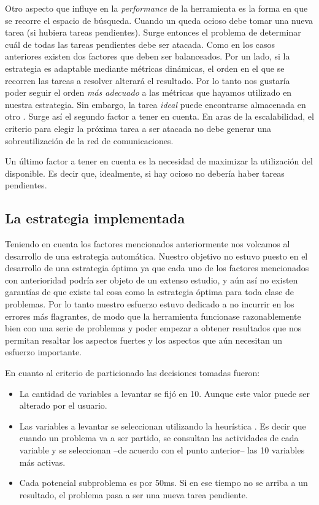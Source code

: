 Otro aspecto que influye en la \emph{performance} de la herramienta es la
forma en que se recorre el espacio de búsqueda. Cuando un \w queda ocioso debe
tomar una nueva tarea (si hubiera tareas pendientes). Surge entonces el
problema de determinar cuál de todas las tareas pendientes debe ser atacada.
Como en los casos anteriores existen dos factores que deben ser balanceados.
Por un lado, si la estrategia es adaptable mediante métricas dinámicas, el
orden en el que se recorren las tareas a resolver alterará el resultado.
 Por lo tanto nos gustaría poder
seguir el orden \emph{más adecuado} a las métricas que hayamos utilizado en
nuestra estrategia. Sin embargo, la tarea \emph{ideal} puede encontrarse
almacenada en otro \w. Surge así el segundo factor a tener en cuenta. En aras
de la escalabilidad, el criterio para elegir la próxima tarea a ser atacada no
debe generar una sobreutilización de la red de comunicaciones.

Un último factor a tener en cuenta es la necesidad de maximizar la utilización
del \hard disponible. Es decir que, idealmente, si hay \hard ocioso no debería
haber tareas pendientes.

\subsection{La estrategia implementada}

Teniendo en cuenta los factores mencionados anteriormente nos volcamos al
desarrollo de una estrategia automática. Nuestro objetivo no estuvo puesto en
el desarrollo de una estrategia óptima ya que cada uno de los factores
mencionados con anterioridad podría ser objeto de un extenso estudio, y aún
así no existen garantías de que existe tal cosa como la estrategia óptima para
toda clase de problemas. Por lo tanto nuestro esfuerzo estuvo dedicado a no
incurrir en los errores más flagrantes, de modo que la herramienta funcionase
razonablemente bien con una serie de problemas y poder empezar a obtener
resultados que nos permitan resaltar los aspectos fuertes y los aspectos que
aún necesitan un esfuerzo importante.

En cuanto al criterio de particionado las decisiones tomadas fueron:

\begin{itemize}
	\item La cantidad de variables a levantar se fijó en 10. Aunque este valor puede ser alterado por el usuario.
	\item Las variables a levantar se seleccionan utilizando la heurística \vsids. Es decir que cuando un problema va a ser partido, se consultan las actividades de cada variable y se seleccionan --de acuerdo con el punto anterior-- las 10 variables más activas.
	\item Cada potencial subproblema es \solveado por 50ms. Si en ese tiempo no se arriba a un resultado, el problema pasa a ser una nueva tarea pendiente.
\end{itemize}

